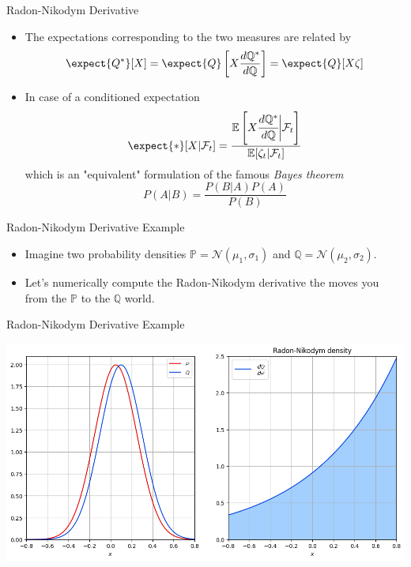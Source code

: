 \documentclass{beamer}
\begin{document}
\begin{frame}{Radon-Nikodym Derivative}
  \begin{itemize}
  \item The expectations corresponding to the two measures are related by
    \begin{equation*}
      \expect{Q^*}[X] = \expect{Q}\left[X\frac{d\mathbb{Q}^*}{d\mathbb{Q}}\right]= \expect{Q}[X\zeta]
    \end{equation*}
	\pause
  \item In case of a conditioned expectation
    \begin{equation}
      \expect{*}[X|\mathcal{F}_t] = \frac{\mathbb{E}\left[X\cfrac{d\mathbb{Q}^*}{d\mathbb{Q}}\bigg|\mathcal{F}_t\right]}{\mathbb{E}[\zeta_t|\mathcal{F}_t]}
      \label{eq:conditioned_expectation}
    \end{equation}
    which is an "equivalent" formulation of the famous \emph{Bayes theorem}
    \begin{equation*}
      P(A|B)=\frac{P(B|A)P(A)}{P(B)}
    \end{equation*}
  \end{itemize}
\end{frame}

\begin{frame}[fragile]{Radon-Nikodym Derivative Example}
  \begin{itemize}
      \item Imagine two probability densities $\mathbb{P} = \mathcal{N}(\mu_1, \sigma_1)$ and $\mathbb{Q} = \mathcal{N}(\mu_2, \sigma_2)$.
      \item Let's numerically compute the Radon-Nikodym derivative the moves you from the $\mathbb{P}$ to the $\mathbb{Q}$ world.
  \end{itemize}

\end{frame}

\begin{frame}[fragile]{Radon-Nikodym Derivative Example}
\begin{center}
    \includegraphics[width=0.9\linewidth]{images/radon_nikodym_plot}
\end{center}
\end{frame}
\end{document}
